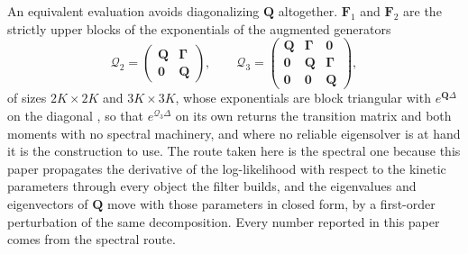 \begin{appendixbox}
An equivalent evaluation avoids diagonalizing $\mathbf{Q}$ altogether. $\mathbf{F}_1$ and
$\mathbf{F}_2$ are the strictly upper blocks of the exponentials of the augmented generators
\begin{equation}
  \mathcal{Q}_2=\begin{pmatrix}\mathbf{Q} & \boldsymbol{\Gamma}\\ \boldsymbol{0} & \mathbf{Q}\end{pmatrix},
  \qquad
  \mathcal{Q}_3=\begin{pmatrix}\mathbf{Q} & \boldsymbol{\Gamma} & \boldsymbol{0}\\
                               \boldsymbol{0} & \mathbf{Q} & \boldsymbol{\Gamma}\\
                               \boldsymbol{0} & \boldsymbol{0} & \mathbf{Q}\end{pmatrix},
  \label{eq:augmented}
\end{equation}
of sizes $2K\times 2K$ and $3K\times 3K$, whose exponentials are block triangular with
$e^{\mathbf{Q}\Delta}$ on the diagonal \citep{vanloan1978computing}, so that
$e^{\mathcal{Q}_3\Delta}$ on its own returns the transition matrix and both moments with no
spectral machinery, and where no reliable eigensolver is at hand it is the construction to
use. The route taken here is the spectral one because this paper propagates the derivative
of the log-likelihood with respect to the kinetic parameters through every object the
filter builds, and the eigenvalues and eigenvectors of $\mathbf{Q}$ move with those
parameters in closed form, by a first-order perturbation of the same decomposition. Every
number reported in this paper comes from the spectral route.

\end{appendixbox}
